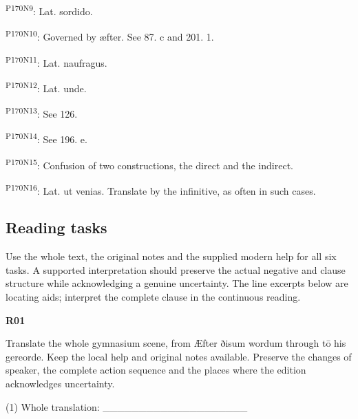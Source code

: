 \textsuperscript{P170N9}: Lat. sordido.

\textsuperscript{P170N10}: Governed by æfter. See 87. c and 201. 1.

\textsuperscript{P170N11}: Lat. naufragus.

\textsuperscript{P170N12}: Lat. unde.

\textsuperscript{P170N13}: See 126.

\textsuperscript{P170N14}: See 196. e.

\textsuperscript{P170N15}: Confusion of two constructions, the direct and the indirect.

\textsuperscript{P170N16}: Lat. ut venias. Translate by the infinitive, as often in such cases.

\subsection*{Reading tasks}

Use the whole text, the original notes and the supplied modern help for all six tasks. A supported interpretation should preserve the actual negative and clause structure while acknowledging a genuine uncertainty. The line excerpts below are locating aids; interpret the complete clause in the continuous reading.

\par\begin{minipage}{\linewidth}\raggedright
\textbf{R01}

Translate the whole gymnasium scene, from Æfter ðisum wordum through tō his gereorde. Keep the local help and original notes available. Preserve the changes of speaker, the complete action sequence and the places where the edition acknowledges uncertainty.

(1) Whole translation: \_\_\_\_\_\_\_\_\_\_\_\_\_\_\_\_\_\_\_\_

\end{minipage}\par\addvspace{4pt}

